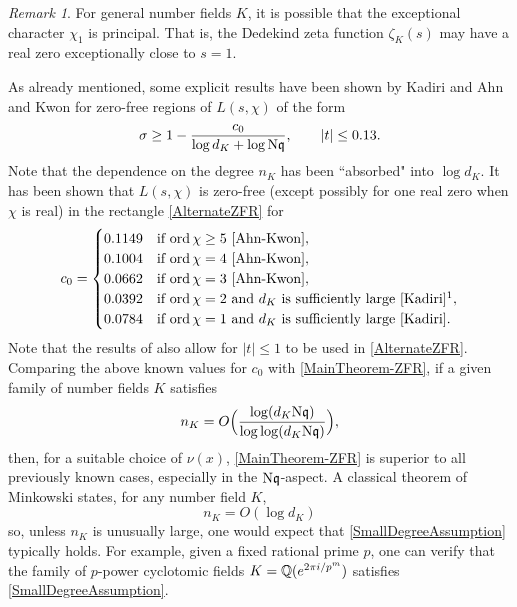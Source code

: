 \documentclass[12pt,psamsfonts]{amsart}
\theoremstyle{definition}
\theoremstyle{remark}
\newtheorem*{rem*}{Remark}
\numberwithin{equation}{section}
\begin{document}
\begin{rem*} For general number fields $K$, it is possible that the exceptional character $\chi_1$ is principal. That is, the Dedekind zeta function $\zeta_K(s)$ may have a real zero exceptionally close to $s=1$.
\end{rem*}
As already mentioned, some explicit results have been shown by Kadiri \cite{Kadiri} and Ahn and Kwon \cite{Ahn-Kwon} for zero-free regions of $L(s,\chi)$ of the form
\begin{equation}
\sigma \geq 1 - \frac{c_0}{\log d_K + \log \mathrm{N}\mathfrak{q}},  \qquad |t| \leq 0.13.
\label{AlternateZFR}
\end{equation}
Note that the dependence on the degree $n_K$ has been ``absorbed" into $\log d_K$.  It has been shown that $L(s,\chi)$ is zero-free (except possibly for one real zero when $\chi$ is real) in the rectangle \eqref{AlternateZFR} for
\[
c_0 = \begin{cases}
0.1149 & \text{if $\ord \chi \geq 5$ \cite{Ahn-Kwon}}, \\
0.1004 & \text{if $\ord \chi = 4$ \cite{Ahn-Kwon}}, \\
0.0662 & \text{if $\ord \chi = 3$ \cite{Ahn-Kwon}},  \\
0.0392 & \text{if $\ord \chi = 2$ and $d_K$ is sufficiently large \cite{Kadiri}}\footnotemark, \\
0.0784 & \text{if $\ord \chi = 1$ and $d_K$ is sufficiently large \cite{Kadiri}.} 
\end{cases}
\]
Note that the results of \cite{Kadiri} also allow for $|t| \leq 1$ to be used in \eqref{AlternateZFR}. Comparing the above known values for $c_0$ with \cref{MainTheorem-ZFR}, if a given family of number fields $K$ satisfies
\begin{equation}
n_K = O\Big( \frac{\log(d_K \mathrm{N}\mathfrak{q})}{\log\log(d_K\mathrm{N}\mathfrak{q})} \Big),
\label{SmallDegreeAssumption}
\end{equation}
then, for a suitable choice of $\nu(x)$, \cref{MainTheorem-ZFR} is superior to all previously known cases, especially in the $\mathrm{N}\mathfrak{q}$-aspect. A classical theorem of Minkowski states, for any number field $K$, 
\[
n_K = O(\log d_K)
\]
so, unless $n_K$ is unusually large, one would expect that \eqref{SmallDegreeAssumption} typically holds. For example, given a fixed rational prime $p$, one can verify that the family of $p$-power cyclotomic fields $K = \mathbb{Q}(e^{2\pi i/p^m})$ satisfies \eqref{SmallDegreeAssumption}. 
\end{document}
